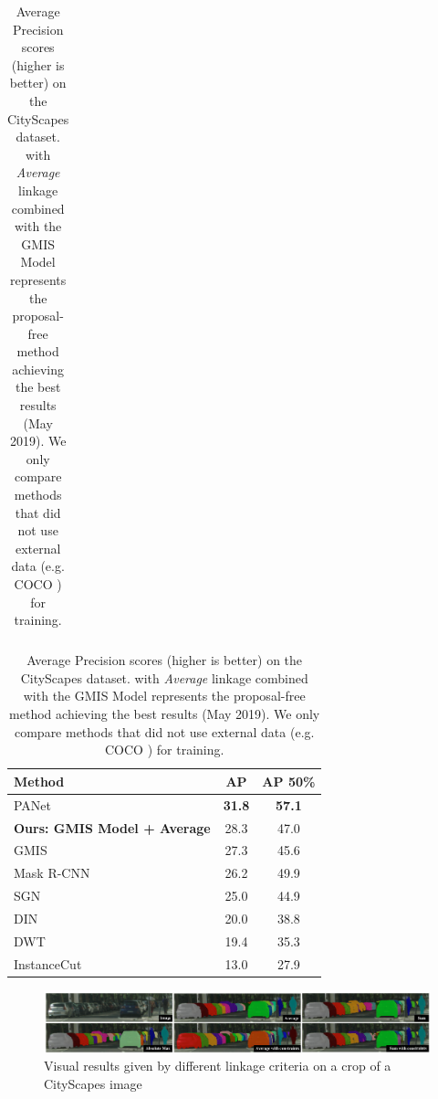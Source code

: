 \begin{table}[t]
\begin{subtable}{0.5 \textwidth}
\begin{tabular}{l|l|cc}
        \end{tabular}
    \caption{CityScapes \emph{validation} set}
    \label{tab:results_cityscapes_val}
\end{subtable}\hfill
\begin{subtable}{0.46\textwidth}
\centering
    \scriptsize
\begin{tabular}{l|cc}
           Method & AP  & AP 50\% \\ \midrule
           PANet \cite{liu2018path} & \textbf{31.8} & \textbf{57.1} \\
           \textbf{Ours: GMIS Model + \algname{} Average} & 28.3 & 47.0 \\ 
           GMIS \cite{liu2018affinity} & 27.3 & 45.6 \\
           Mask R-CNN \cite{he2017mask} & 26.2 & 49.9 \\
           SGN \cite{liu2017sgn} & 25.0 & 44.9 \\
           DIN \cite{arnab2017pixelwise} & 20.0 & 38.8 \\
           DWT \cite{bai2017deep} & 19.4 & 35.3 \\
           InstanceCut \cite{kirillov2017instancecut} & 13.0 & 27.9 \\

        \end{tabular}
    \caption{CityScapes \emph{test} set}
    \label{tab:results_cityscapes_test}
\end{subtable}
\caption{Average Precision scores (higher is better) on the CityScapes dataset. \algname{} with \emph{Average} linkage combined with the GMIS Model \cite{liu2018affinity} represents the proposal-free method achieving the best results (May 2019). We only compare methods that did not use external data (e.g. COCO \cite{lin2014microsoft}) for training.}
\end{table}

\begin{figure}
\centering
\includegraphics[width=\textwidth]{./figs/cityscapes_compare_4.pdf} %
\caption{Visual results given by different \algname{} linkage criteria on a crop of a CityScapes image}\label{fig:cityscapes}
\end{figure}
